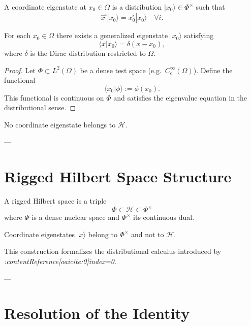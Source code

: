 \documentclass[11pt]{article}
\begin{document}
\begin{definition}
A coordinate eigenstate at $x_0\in\Omega$ is a distribution
$|x_0\rangle \in \Phi^\times$ such that
\[
\hat x^i |x_0\rangle = x_0^i |x_0\rangle
\quad \forall i.
\]
\end{definition}

\begin{theorem}
For each $x_0\in\Omega$ there exists a generalized eigenstate $|x_0\rangle$ satisfying
\[
\langle x|x_0\rangle = \delta(x-x_0),
\]
where $\delta$ is the Dirac distribution restricted to $\Omega$.
\end{theorem}

\begin{proof}
Let $\Phi\subset L^2(\Omega)$ be a dense test space (e.g.\ $C_c^\infty(\Omega)$).
Define the functional
\[
\langle x_0|\phi\rangle := \phi(x_0).
\]
This functional is continuous on $\Phi$ and satisfies the eigenvalue equation in the distributional sense.
\end{proof}

\begin{corollary}
No coordinate eigenstate belongs to $\mathcal H$.
\end{corollary}

---

\section{Rigged Hilbert Space Structure}

\begin{definition}
A rigged Hilbert space is a triple
\[
\Phi \subset \mathcal H \subset \Phi^\times
\]
where $\Phi$ is a dense nuclear space and $\Phi^\times$ its continuous dual.
\end{definition}

\begin{proposition}
Coordinate eigenstates $|x\rangle$ belong to $\Phi^\times$ and not to $\mathcal H$.
\end{proposition}

This construction formalizes the distributional calculus introduced by
\emph{:contentReference[oaicite:0]{index=0}}.

---

\section{Resolution of the Identity}
\end{document}
